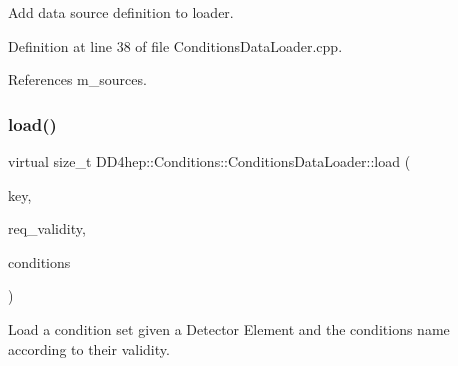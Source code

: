 Add data source definition to loader. 



Definition at line 38 of file Conditions\+Data\+Loader.\+cpp.



References m\+\_\+sources.

\hypertarget{class_d_d4hep_1_1_conditions_1_1_conditions_data_loader_a5ae9c04eb1198bf3ca9bc6d54e6bfd8c}{}\label{class_d_d4hep_1_1_conditions_1_1_conditions_data_loader_a5ae9c04eb1198bf3ca9bc6d54e6bfd8c} 
\subsubsection{\texorpdfstring{load()}{load()}}
{\footnotesize\ttfamily virtual size\+\_\+t D\+D4hep\+::\+Conditions\+::\+Conditions\+Data\+Loader\+::load (\begin{DoxyParamCaption}\item[{\hyperlink{class_d_d4hep_1_1_conditions_1_1_conditions_data_loader_ac17b71656c9d6b5365c62d1d606ba8cc}{key\+\_\+type}}]{key,  }\item[{const \hyperlink{class_d_d4hep_1_1_conditions_1_1_conditions_data_loader_a510aa9a02f5e798d8d96c9e3cb5a36af}{iov\+\_\+type} \&}]{req\+\_\+validity,  }\item[{\hyperlink{namespace_d_d4hep_1_1_conditions_ae765f0140a33973a430280f02b6062f4}{Range\+Conditions} \&}]{conditions }\end{DoxyParamCaption})\hspace{0.3cm}{\ttfamily [pure virtual]}}



Load a condition set given a Detector Element and the conditions name according to their validity. 

\hypertarget{class_d_d4hep_1_1_conditions_1_1_conditions_data_loader_a7c62044af7a8672ab9cb2b5bcf1022b3}{}\label{class_d_d4hep_1_1_conditions_1_1_conditions_data_loader_a7c62044af7a8672ab9cb2b5bcf1022b3} 
